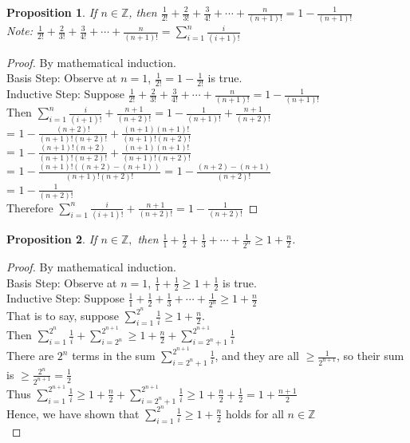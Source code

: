 \documentclass{article}
\newtheorem*{theorem}{Proposition}
\begin{document}
\begin{theorem}
    If \(n \in \mathbb{Z}\), then \(\frac{1}{2!} + \frac{2}{3!} + \frac{3}{4!} + \cdots + \frac{n}{(n+1)!} = 1 - \frac{1}{(n + 1)!}\) \\
    Note: \(\frac{1}{2!} + \frac{2}{3!} + \frac{3}{4!} + \cdots + \frac{n}{(n+1)!} = \sum_{i=1}^{n}{\frac{i}{(i+1)!}}\)
\end{theorem}
\begin{proof}
    By mathematical induction. \\
    Basis Step: Observe at \(n = 1\), \(\frac{1}{2!} = 1 - \frac{1}{2!}\) is true. \\
    Inductive Step: Suppose \(\frac{1}{2!} + \frac{2}{3!} + \frac{3}{4!} + \cdots + \frac{n}{(n+1)!} = 1 - \frac{1}{(n + 1)!}\) \\
    Then \(\sum_{i=1}^{n}{\frac{i}{(i+1)!}} + \frac{n+1}{(n+2)!} = 1-\frac{1}{(n+1)!} + \frac{n+1}{(n+2)!}\) \\
    = \(1 - \frac{(n+2)!}{(n+1)!(n+2)!} + \frac{(n+1)(n+1)!}{(n+1)!(n+2)!}\) \\
    = \(1 - \frac{(n+1)!(n+2)}{(n+1)!(n+2)!} + \frac{(n+1)(n+1)!}{(n+1)!(n+2)!}\) \\
    = \(1 - \frac{(n+1)!((n+2)-(n+1))}{(n+1)!(n+2)!}\) = \(1 - \frac{(n+2)-(n+1)}{(n+2)!}\) \\
    = \(1 - \frac{1}{(n+2)!}\) \\
    Therefore \(\sum_{i=1}^{n}{\frac{i}{(i+1)!}} + \frac{n+1}{(n+2)!} = 1 - \frac{1}{(n+2)!}\)
\end{proof}

\begin{theorem}
    If \(n \in \mathbb{Z}, \) then \(\frac{1}{1} + \frac{1}{2} + \frac{1}{3} + \cdots + \frac{1}{2^n} \geq 1 + \frac{n}{2}\).
\end{theorem}
\begin{proof}
    By mathematical induction. \\
    Basis Step: Observe at \(n = 1\), \(\frac{1}{1} + \frac{1}{2} \geq 1 + \frac{1}{2}\) is true. \\
    Inductive Step: Suppose \(\frac{1}{1} + \frac{1}{2} + \frac{1}{3} + \cdots + \frac{1}{2^n} \geq 1 + \frac{n}{2}\) \\
    That is to say, suppose \(\sum_{i=1}^{2^n}{\frac{1}{i}} \geq 1 + \frac{n}{2}\). \\
    Then \(\sum_{i=1}^{2^n}{\frac{1}{i}} + \sum_{i=2^n}^{2^{n+1}} \geq 1 + \frac{n}{2} + \sum_{i=2^n+1}^{2^{n+1}}{\frac{1}{i}}\) \\
    There are \(2^n\) terms in the sum \(\sum_{i=2^n+1}^{2^{n+1}}{\frac{1}{i}}\), and they are all \(\geq \frac{1}{2^{n+1}}\), so their sum is \(\geq \frac{2^n}{2^{n+1}} = \frac{1}{2}\) \\
    Thus \(\sum_{i=1}^{2^{n+1}}{\frac{1}{i}} \geq 1 + \frac{n}{2} + \sum_{i=2^n+1}^{2^{n+1}}{\frac{1}{i}} \geq 1 + \frac{n}{2} + \frac{1}{2} = 1 + \frac{n+1}{2}\) \\
    Hence, we have shown that \(\sum_{i=1}^{2^n}{\frac{1}{i}} \geq 1 + \frac{n}{2}\) holds for all \(n \in \mathbb{Z}\) \\
\end{proof}
\end{document}
